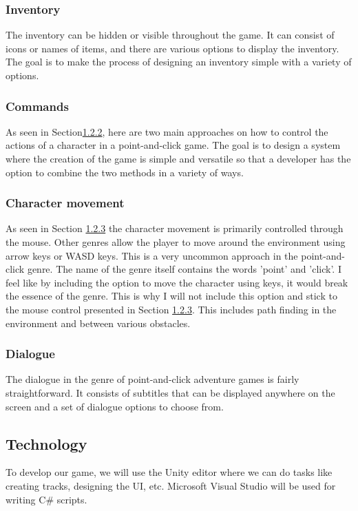 \subsubsection{Inventory}
The inventory can be hidden or visible throughout the game. It can consist of icons or names of items, and there are various options to display the inventory. The goal is to make the process of designing an inventory simple with a variety of options.

\subsubsection{Commands}
As seen in Section\hyperref[sec:Commands]{1.2.2}, here are two main approaches on how to control the actions of a character in a point-and-click game. The goal is to design a system where the creation of the game is simple and versatile so that a developer has the option to combine the two methods in a variety of ways.

\subsubsection{Character movement}
As seen in Section \hyperref[sec:Character movement]{1.2.3} the character movement is primarily controlled through the mouse. Other genres allow the player to move around the environment using arrow keys or WASD keys. This is a very uncommon approach in the point-and-click genre. The name of the genre itself contains the words 'point' and 'click'. I feel like by including the option to move the character using keys, it would break the essence of the genre. This is why I will not include this option and stick to the mouse control presented in Section \hyperref[sec:Character movement]{1.2.3}. This includes path finding in the environment and between various obstacles.

\subsubsection{Dialogue}
The dialogue in the genre of point-and-click adventure games is fairly straightforward. It consists of subtitles that can be displayed anywhere on the screen and a set of dialogue options to choose from.

\subsection{Technology}
To develop our game, we will use the Unity editor where we can do tasks like creating tracks, designing the UI, etc. Microsoft Visual Studio will be used for writing C# scripts. 


